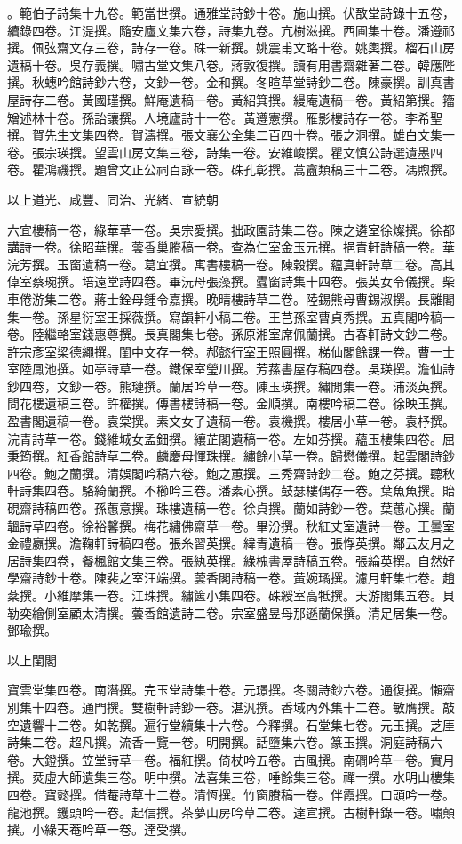 \begin{pinyinscope}
。範伯子詩集十九卷。範當世撰。通雅堂詩鈔十卷。施山撰。伏敔堂詩錄十五卷，續錄四卷。江湜撰。隨安廬文集六卷，詩集九卷。亢樹滋撰。西圃集十卷。潘遵祁撰。佩弦齋文存三卷，詩存一卷。硃一新撰。姚震甫文略十卷。姚輿撰。榴石山房遺稿十卷。吳存義撰。嘯古堂文集八卷。蔣敦復撰。讀有用書齋雜著二卷。韓應陛撰。秋蟪吟館詩鈔六卷，文鈔一卷。金和撰。冬暄草堂詩鈔二卷。陳豪撰。訓真書屋詩存二卷。黃國瑾撰。鮮庵遺稿一卷。黃紹箕撰。縵庵遺稿一卷。黃紹第撰。籀矰述林十卷。孫詒讓撰。人境廬詩十一卷。黃遵憲撰。雁影樓詩存一卷。李希聖撰。賀先生文集四卷。賀濤撰。張文襄公全集二百四十卷。張之洞撰。雄白文集一卷。張宗瑛撰。望雲山房文集三卷，詩集一卷。安維峻撰。瞿文慎公詩選遺墨四卷。瞿鴻禨撰。題曾文正公祠百詠一卷。硃孔彰撰。蒿盦類稿三十二卷。馮煦撰。

以上道光、咸豐、同治、光緒、宣統朝

六宜樓稿一卷，綠華草一卷。吳宗愛撰。拙政園詩集二卷。陳之遴室徐燦撰。徐都講詩一卷。徐昭華撰。蕓香巢賸稿一卷。查為仁室金玉元撰。挹青軒詩稿一卷。華浣芳撰。玉窗遺稿一卷。葛宜撰。寓書樓稿一卷。陳穀撰。蘊真軒詩草二卷。高其倬室蔡琬撰。培遠堂詩四卷。畢沅母張藻撰。蠹窗詩集十四卷。張英女令儀撰。柴車倦游集二卷。蔣士銓母鍾令嘉撰。晚晴樓詩草二卷。陸錫熊母曹錫淑撰。長離閣集一卷。孫星衍室王採薇撰。寫韻軒小稿二卷。王芑孫室曹貞秀撰。五真閣吟稿一卷。陸繼輅室錢惠尊撰。長真閣集七卷。孫原湘室席佩蘭撰。古春軒詩文鈔二卷。許宗彥室梁德繩撰。閨中文存一卷。郝懿行室王照圓撰。梯仙閣餘課一卷。曹一士室陸鳳池撰。如亭詩草一卷。鐵保室瑩川撰。芳蓀書屋存稿四卷。吳瑛撰。澹仙詩鈔四卷，文鈔一卷。熊璉撰。蘭居吟草一卷。陳玉瑛撰。繡閒集一卷。浦淡英撰。問花樓遺稿三卷。許權撰。傳書樓詩稿一卷。金順撰。南樓吟稿二卷。徐映玉撰。盈書閣遺稿一卷。袁棠撰。素文女子遺稿一卷。袁機撰。樓居小草一卷。袁杼撰。浣青詩草一卷。錢維城女孟鈿撰。纕芷閣遺稿一卷。左如芬撰。蘊玉樓集四卷。屈秉筠撰。紅香館詩草二卷。麟慶母惲珠撰。繡餘小草一卷。歸懋儀撰。起雲閣詩鈔四卷。鮑之蘭撰。清娛閣吟稿六卷。鮑之蕙撰。三秀齋詩鈔二卷。鮑之芬撰。聽秋軒詩集四卷。駱綺蘭撰。不櫛吟三卷。潘素心撰。鼓瑟樓偶存一卷。葉魚魚撰。貽硯齋詩稿四卷。孫蕙意撰。珠樓遺稿一卷。徐貞撰。蘭如詩鈔一卷。葉蕙心撰。蘭韞詩草四卷。徐裕馨撰。梅花繡佛齋草一卷。畢汾撰。秋紅丈室遺詩一卷。王曇室金禮嬴撰。澹鞠軒詩稿四卷。張糸習英撰。緯青遺稿一卷。張惸英撰。鄰云友月之居詩集四卷，餐楓館文集三卷。張紈英撰。綠槐書屋詩稿五卷。張綸英撰。自然好學齋詩鈔十卷。陳裴之室汪端撰。蕓香閣詩稿一卷。黃婉璚撰。濾月軒集七卷。趙棻撰。小維摩集一卷。江珠撰。繡篋小集四卷。硃綬室高牴撰。天游閣集五卷。貝勒奕繪側室顧太清撰。蕓香館遺詩二卷。宗室盛昱母那遜蘭保撰。清足居集一卷。鄧瑜撰。

以上閨閣

寶雲堂集四卷。南潛撰。完玉堂詩集十卷。元璟撰。冬關詩鈔六卷。通復撰。懶齋別集十四卷。通門撰。雙樹軒詩鈔一卷。湛汎撰。香域內外集十二卷。敏膺撰。敲空遺響十二卷。如乾撰。遍行堂續集十六卷。今釋撰。石堂集七卷。元玉撰。芝厓詩集二卷。超凡撰。流香一覽一卷。明開撰。話墮集六卷。篆玉撰。洞庭詩稿六卷。大鐙撰。笠堂詩草一卷。福紅撰。倚杖吟五卷。古風撰。南磵吟草一卷。實月撰。烎虛大師遺集三卷。明中撰。法喜集三卷，唾餘集三卷。禪一撰。水明山樓集四卷。寶懿撰。借菴詩草十二卷。清恆撰。竹窗賸稿一卷。伴霞撰。口頭吟一卷。龍池撰。钁頭吟一卷。起信撰。茶夢山房吟草二卷。達宣撰。古樹軒錄一卷。嘯顛撰。小綠天菴吟草一卷。達受撰。


\end{pinyinscope}
